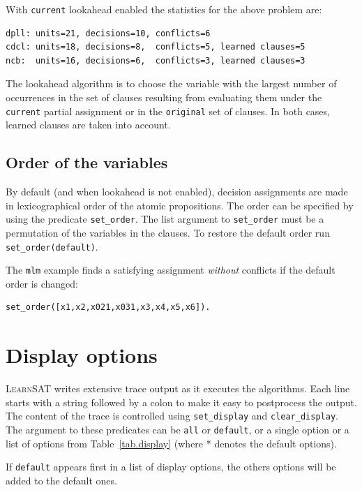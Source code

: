 \documentclass[11pt]{article}
\newcommand*{\p}[1]{\textup{\texttt{#1}}}
\newcommand*{\ls}{\textsc{LearnSAT}}
\begin{document}
With \p{current} lookahead enabled the statistics for the above problem are:
\begin{verbatim}
dpll: units=21, decisions=10, conflicts=6
cdcl: units=18, decisions=8,  conflicts=5, learned clauses=5
ncb:  units=16, decisions=6,  conflicts=3, learned clauses=3
\end{verbatim}
The lookahead algorithm is to choose the variable with the largest number of occurrences in the set of clauses resulting from evaluating them under the \p{current} partial assignment or in the \p{original} set of clauses. In both cases, learned clauses are taken into account.

\subsection{Order of the variables}

By default (and when lookahead is not enabled), decision assignments are made in lexicographical order of the atomic propositions. The order can be specified by using the predicate \p{set\_order}. The list argument to \p{set\_order} must be a permutation of the variables in the clauses. To restore the default order run \p{set\_order(default)}.

The \p{mlm} example finds a satisfying assignment \emph{without}
conflicts if the default order is changed:

\begin{verbatim}
set_order([x1,x2,x021,x031,x3,x4,x5,x6]).
\end{verbatim}

\newpage

\section{Display options}

\ls{} writes extensive trace output as it executes the algorithms. Each line starts with a string followed by a colon to make it easy to postprocess the output. The content of the trace is controlled using \p{set\_display} and \p{clear\_display}. The argument to these predicates can be \p{all} or \p{default}, or a single option or a list of options from Table~\ref{tab.display} (where * denotes the default options).

If \p{default} appears first in a list of display options, the others options will be added to the default ones.
\end{document}
